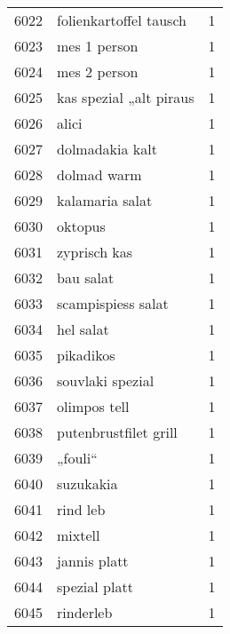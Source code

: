 \begin{tabular}{llr}
6022 &                             folienkartoffel tausch &      1 \\
6023 &                                       mes 1 person &      1 \\
6024 &                                       mes 2 person &      1 \\
6025 &                            kas spezial „alt piraus &      1 \\
6026 &                                              alici &      1 \\
6027 &                                    dolmadakia kalt &      1 \\
6028 &                                        dolmad warm &      1 \\
6029 &                                    kalamaria salat &      1 \\
6030 &                                            oktopus &      1 \\
6031 &                                       zyprisch kas &      1 \\
6032 &                                          bau salat &      1 \\
6033 &                                 scampispiess salat &      1 \\
6034 &                                          hel salat &      1 \\
6035 &                                          pikadikos &      1 \\
6036 &                                   souvlaki spezial &      1 \\
6037 &                                       olimpos tell &      1 \\
6038 &                              putenbrustfilet grill &      1 \\
6039 &                                            „fouli“ &      1 \\
6040 &                                          suzukakia &      1 \\
6041 &                                           rind leb &      1 \\
6042 &                                            mixtell &      1 \\
6043 &                                       jannis platt &      1 \\
6044 &                                      spezial platt &      1 \\
6045 &                                          rinderleb &      1 \\

\end{tabular}
